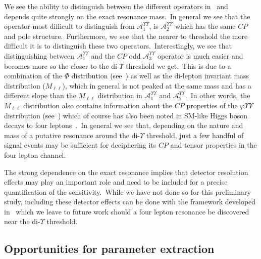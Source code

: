 \documentclass[nofootinbib,twocolumn,prl,preprintnumbers]{revtex4-1}
\begin{document}
We see the ability to distinguish between the different operators in~ and~ depends quite strongly on the exact resonance mass.~In general we see that the operator most difficult to distinguish from $\mathcal{A}_{1}^{\Upsilon\Upsilon}$, is $\mathcal{A}_{2}^{\Upsilon\Upsilon}$ which has the same $CP$ and pole structure.~Furthermore, we see that the nearer to threshold the more difficult it is to distinguish these two operators.~Interestingly, we see that distinguishing between $\mathcal{A}_{1}^{\Upsilon\Upsilon}$ and the $CP$ odd $\mathcal{A}_{3}^{\Upsilon\Upsilon}$ operator is much easier and becomes more so the closer to the di-$\Upsilon$ threshold we get.~This is due to a combination of the $\Phi$ distribution (see~) as well as the di-lepton invariant mass distribution ($M_{\ell\ell}$), which in general is not peaked at the same mass and has a different slope than the $M_{\ell\ell}$ distribution in $\mathcal{A}_{1}^{\Upsilon\Upsilon}$ and $\mathcal{A}_{2}^{\Upsilon\Upsilon}$.~In other words, the $M_{\ell\ell}$ distribution also contains information about the $CP$ properties of the $\varphi\Upsilon\Upsilon$ distribution (see~) which of course has also been noted in SM-like Higgs boson decays to four leptons~\cite{Boughezal:2012tz}.~In general we see that, depending on the nature and mass of a putative resonance around the di-$\Upsilon$ threshold, just a few handful of signal events may be sufficient for deciphering its $CP$ and tensor properties in the four lepton channel.

The strong dependence on the exact resonance implies that detector resolution effects may play an important role and need to be included for a precise quantification of the sensitivity.~While we have not done so for this preliminary study, including these detector effects can be done with the framework developed in~\cite{Chen:2014pia,Chen:2014hqs} which we leave to future work should a four lepton resonance be discovered near the di-$\Upsilon$ threshold.

\subsection{Opportunities for parameter extraction} \label{sec:fits}
\end{document}
